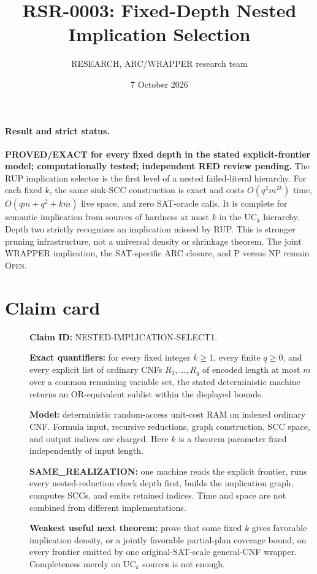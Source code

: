 \documentclass[11pt]{article}
\title{RSR-0003: Fixed-Depth Nested Implication Selection}
\author{RESEARCH, ARC/WRAPPER research team}
\date{7 October 2026}
\begin{document}
\maketitle

\paragraph{Result and strict status.}
\textbf{PROVED/EXACT for every fixed depth in the stated explicit-frontier
model; computationally tested; independent RED review pending.}
The RUP implication selector is the first level of a nested failed-literal
hierarchy.  For each fixed $k$, the same sink-SCC construction is exact and
costs $O(q^2m^{2k})$ time, $O(qm+q^2+km)$ live space, and zero SAT-oracle
calls.  It is complete for semantic implication from sources of hardness at
most $k$ in the $\mathrm{UC}_k$ hierarchy.  Depth two strictly recognizes an
implication missed by RUP.  This is stronger pruning infrastructure, not a
universal density or shrinkage theorem.  The joint WRAPPER implication, the
SAT-specific ARC closure, and P versus NP remain \textsc{Open}.

\section*{Claim card}
\begin{description}
\item[] \textbf{Claim ID:} NESTED-IMPLICATION-SELECT1.
\item[] \textbf{Exact quantifiers:} for every fixed integer $k\geq1$, every
finite $q\geq0$, and every explicit list of ordinary CNFs
$R_1,\ldots,R_q$ of encoded length at most $m$ over a common remaining
variable set, the stated deterministic machine returns an OR-equivalent
sublist within the displayed bounds.
\item[] \textbf{Model:} deterministic random-access unit-cost RAM on indexed
ordinary CNF.  Formula input, recursive reductions, graph construction, SCC
space, and output indices are charged.  Here $k$ is a theorem parameter fixed
independently of input length.
\item[] \textbf{SAME\_REALIZATION:} one machine reads the explicit frontier,
runs every nested-reduction check depth first, builds the implication graph,
computes SCCs, and emits retained indices.  Time and space are not combined
from different implementations.
\item[] \textbf{Weakest useful next theorem:} prove that some fixed $k$ gives
favorable implication density, or a jointly favorable partial-plan coverage
bound, on every frontier emitted by one original-SAT-scale general-CNF
wrapper.  Completeness merely on $\mathrm{UC}_k$ sources is not enough.
\end{description}
\end{document}
